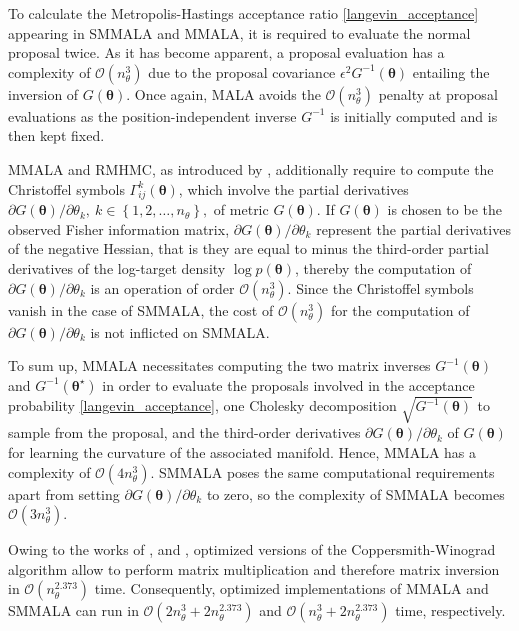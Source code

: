 \documentclass[twoside,11pt]{article}
\begin{document}
To calculate the Metropolis-Hastings acceptance ratio \eqref{langevin_acceptance} appearing in SMMALA and MMALA,
it is required to evaluate the normal proposal twice. As it has become apparent, a proposal evaluation has a complexity of
$\mathcal{O}(n_\theta^3)$ due to the proposal covariance $\epsilon^2 G^{-1}(\boldsymbol{\theta})$ entailing the inversion of 
$G(\boldsymbol{\theta})$. Once again, MALA avoids the $\mathcal{O}(n_\theta^3)$ penalty at proposal evaluations as the
position-independent inverse $G^{-1}$ is initially computed and is then kept fixed.

MMALA and RMHMC, as introduced by \cite{gir_cal__rie}, additionally require to compute the Christoffel symbols 
$\Gamma^{k}_{ij}(\boldsymbol{\theta})$, which involve
the partial derivatives $\partial G(\boldsymbol{\theta})/\partial\theta_k,~k\in\left\{1,2,\dots,n_{\theta}\right\},$
of metric $G(\boldsymbol{\theta})$. If $G(\boldsymbol{\theta})$ is chosen to be the 
observed Fisher information matrix, $\partial G(\boldsymbol{\theta})/\partial\theta_k$ represent the partial derivatives of 
the negative Hessian, that is they are equal to minus the third-order partial derivatives of the log-target density 
$\log{p(\boldsymbol{\theta})}$, thereby the computation of $\partial G(\boldsymbol{\theta})/\partial\theta_k$ is an 
operation of order $\mathcal{O}(n_\theta^3)$. Since the Christoffel symbols vanish in the case of SMMALA, the cost of
$\mathcal{O}(n_\theta^3)$ for the computation of $\partial G(\boldsymbol{\theta})/\partial\theta_k$ is not inflicted on
SMMALA.

To sum up, MMALA necessitates computing the two matrix inverses $G^{-1}(\boldsymbol{\theta})$ and 
$G^{-1}(\boldsymbol{\theta}^{\star})$ in order to evaluate the proposals involved in the acceptance probability 
\eqref{langevin_acceptance}, one Cholesky decomposition $\sqrt{G^{-1}(\boldsymbol{\theta})}$ to sample from the proposal, 
and the third-order derivatives $\partial G(\boldsymbol{\theta})/\partial\theta_k$ of $G(\boldsymbol{\theta})$
for learning the curvature of the associated manifold. Hence, MMALA has a complexity of $\mathcal{O}(4n_\theta^3)$. 
%
SMMALA poses the same computational requirements apart from setting $\partial G(\boldsymbol{\theta})/\partial\theta_k$ to zero, so 
the complexity of SMMALA becomes $\mathcal{O}(3n_\theta^3)$.

Owing to the works of \cite{dav_sto__imp}, \cite{wil__brea} and \cite{leg__pow},
optimized versions of the Coppersmith-Winograd algorithm allow to perform matrix multiplication and therefore matrix 
inversion in $\mathcal{O}(n_\theta^{2.373})$ time. Consequently, optimized implementations of MMALA and SMMALA can run in
$\mathcal{O}(2n_\theta^3+2n_\theta^{2.373})$ and $\mathcal{O}(n_\theta^3+2n_\theta^{2.373})$ time, respectively.
\end{document}
